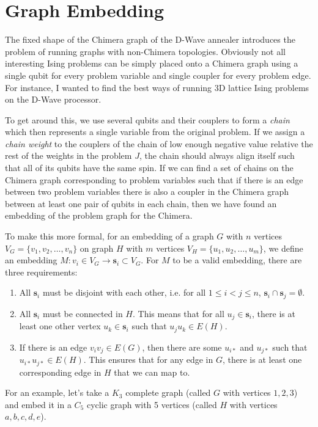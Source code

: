 \documentclass[11pt]{report}
\newcommand{\?}{\stackrel{?}{=}}
\begin{document}
\section{Graph Embedding}

The fixed shape of the Chimera graph of the D-Wave annealer introduces the problem of running graphs with non-Chimera topologies. Obviously not all interesting Ising problems can be simply placed onto a Chimera graph using a single qubit for every problem variable and single coupler for every problem edge. For instance, I wanted to find the best ways of running 3D lattice Ising problems on the D-Wave processor.

To get around this, we use several qubits and their couplers to form a \textit{chain} which then represents a single variable from the original problem. If we assign a \textit{chain weight} to the couplers of the chain of low enough negative value relative the rest of the weights in the problem $J$, the chain should always align itself such that all of its qubits have the same spin. If we can find a set of chains on the Chimera graph corresponding to problem variables such that if there is an edge between two problem variables there is also a coupler in the Chimera graph between at least one pair of qubits in each chain, then we have found an embedding of the problem graph for the Chimera.

To make this more formal, for an embedding of a graph $G$ with $n$ vertices $V_G = \{v_1, v_2, \ldots, v_n\}$ on graph $H$ with $m$ vertices $V_H = \{u_1, u_2, \ldots, u_m\}$, we define an embedding $M: v_i \in V_G \rightarrow \mathbf{s}_i \subset V_G$. For $M$ to be a valid embedding, there are three requirements:
\begin{enumerate}
	\item All $\mathbf{s}_i$ must be disjoint with each other, i.e. for all $1 \leq i < j \leq n$, $\mathbf{s}_i \cap \mathbf{s}_j = \emptyset$.
	\item All $\mathbf{s}_i$ must be connected in $H$. This means that for all $u_j \in \mathbf{s}_i$, there is at least one other vertex $u_k \in \mathbf{s}_i$ such that $u_ju_k \in E(H)$.
	\item If there is an edge $v_iv_j \in E(G)$, then there are some $u_{i*}$ and $u_{j*}$ such that $u_{i*}u_{j*} \in E(H)$. This ensures that for any edge in $G$, there is at least one corresponding edge in $H$ that we can map to.
\end{enumerate}

For an example, let's take a $K_3$ complete graph (called $G$ with vertices $1,2,3$) and embed it in a $C_5$ cyclic graph with 5 vertices (called $H$ with vertices $a,b,c,d,e$).
\end{document}
